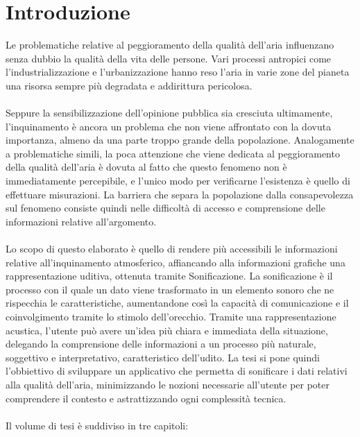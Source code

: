 %
\chapter*{Introduzione}                 %

Le problematiche relative al peggioramento della qualità dell'aria influenzano senza dubbio la qualità della vita delle persone.
Vari processi antropici come l'industrializzazione e l'urbanizzazione hanno reso l'aria in varie zone del pianeta una risorsa sempre più degradata e addirittura pericolosa.
\\\\
Seppure la sensibilizzazione dell'opinione pubblica sia cresciuta ultimamente, l'inquinamento è ancora un problema che non viene affrontato con la dovuta importanza, almeno da una parte troppo grande della popolazione.
Analogamente a problematiche simili, la poca attenzione che viene dedicata al peggioramento della qualità dell'aria è dovuta al fatto che questo fenomeno non è immediatamente percepibile, e l'unico modo per verificarne l'esistenza è quello di effettuare misurazioni.
La barriera che separa la popolazione dalla consapevolezza sul fenomeno consiste quindi nelle difficoltà di accesso e comprensione delle informazioni relative all'argomento.
\\\\
Lo scopo di questo elaborato è quello di rendere più accessibili le informazioni relative all'inquinamento atmosferico, affiancando alla informazioni grafiche una rappresentazione uditiva, ottenuta tramite Sonificazione.
La sonificazione è il processo con il quale un dato viene trasformato in un elemento sonoro che ne rispecchia le caratteristiche, aumentandone così la capacità di comunicazione e il coinvolgimento tramite lo stimolo dell'orecchio.
Tramite una rappresentazione acustica, l'utente può avere un'idea più chiara e immediata della situazione, delegando la comprensione delle informazioni a un processo più naturale, soggettivo e interpretativo, caratteristico dell'udito.
La tesi si pone quindi l'obbiettivo di sviluppare un applicativo che permetta di sonificare i dati relativi alla qualità dell'aria, minimizzando le nozioni necessarie all'utente per poter comprendere il contesto e astrattizzando ogni complessità tecnica.
\\\\
Il volume di tesi è suddiviso in tre capitoli:

